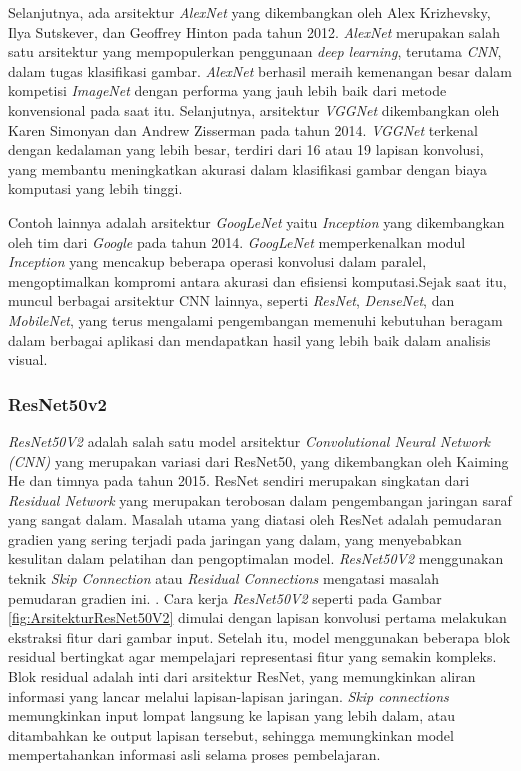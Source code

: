 Selanjutnya, ada arsitektur \textit{AlexNet} yang dikembangkan oleh Alex Krizhevsky, Ilya Sutskever, dan Geoffrey Hinton pada tahun 2012. \textit{AlexNet} merupakan salah satu arsitektur yang mempopulerkan penggunaan \textit{deep learning}, terutama \textit{CNN}, dalam tugas klasifikasi gambar. \textit{AlexNet} berhasil meraih kemenangan besar dalam kompetisi \textit{ImageNet} dengan performa yang jauh lebih baik dari metode konvensional pada saat itu. Selanjutnya, arsitektur \textit{VGGNet} dikembangkan oleh Karen Simonyan dan Andrew Zisserman pada tahun 2014. \textit{VGGNet} terkenal dengan kedalaman yang lebih besar, terdiri dari 16 atau 19 lapisan konvolusi, yang membantu meningkatkan akurasi dalam klasifikasi gambar dengan biaya komputasi yang lebih tinggi.

Contoh lainnya adalah arsitektur \textit{GoogLeNet} yaitu \textit{Inception} yang dikembangkan oleh tim dari \textit{Google} pada tahun 2014. \textit{GoogLeNet} memperkenalkan modul \textit{Inception} yang mencakup beberapa operasi konvolusi dalam paralel, mengoptimalkan kompromi antara akurasi dan efisiensi komputasi.Sejak saat itu, muncul berbagai arsitektur CNN lainnya, seperti \textit{ResNet}, \textit{DenseNet}, dan \textit{MobileNet}, yang terus mengalami pengembangan memenuhi kebutuhan beragam dalam berbagai aplikasi dan mendapatkan hasil yang lebih baik dalam analisis visual.

\subsubsection{ResNet50v2}
\textit{ResNet50V2} adalah salah satu model arsitektur \textit{Convolutional Neural Network (CNN)} yang merupakan variasi dari ResNet50, yang dikembangkan oleh Kaiming He dan timnya pada tahun 2015. ResNet sendiri merupakan singkatan dari \textit{Residual Network} yang merupakan terobosan dalam pengembangan jaringan saraf yang sangat dalam. Masalah utama yang diatasi oleh ResNet adalah pemudaran gradien yang sering terjadi pada jaringan yang dalam, yang menyebabkan kesulitan dalam pelatihan dan pengoptimalan model. \textit{ResNet50V2} menggunakan teknik \textit{Skip Connection} atau \textit{Residual Connections} mengatasi masalah pemudaran gradien ini. \cite{rahimzadeh2020modified} . Cara kerja \textit{ResNet50V2} seperti pada Gambar \ref{fig:ArsitekturResNet50V2}
dimulai dengan lapisan konvolusi pertama melakukan ekstraksi fitur dari gambar input. Setelah itu, model menggunakan beberapa blok residual bertingkat agar mempelajari representasi fitur yang semakin kompleks. Blok residual adalah inti dari arsitektur ResNet, yang memungkinkan aliran informasi yang lancar melalui lapisan-lapisan jaringan. \textit{Skip connections} memungkinkan input lompat langsung ke lapisan yang lebih dalam, atau ditambahkan ke output lapisan tersebut, sehingga memungkinkan model mempertahankan informasi asli selama proses pembelajaran.

